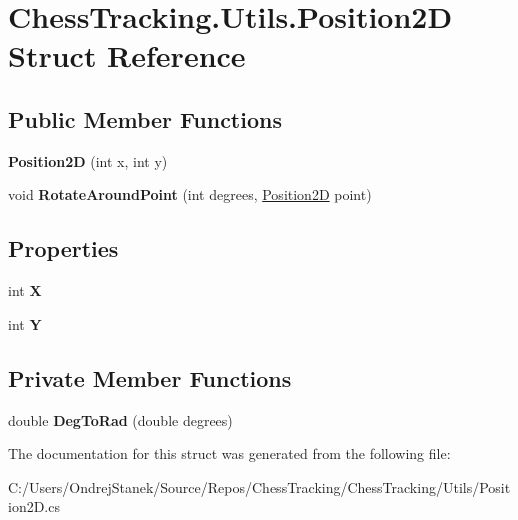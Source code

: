 \hypertarget{struct_chess_tracking_1_1_utils_1_1_position2_d}{}\section{Chess\+Tracking.\+Utils.\+Position2D Struct Reference}
\label{struct_chess_tracking_1_1_utils_1_1_position2_d}
\subsection*{Public Member Functions}
\begin{DoxyCompactItemize}
\item 
\mbox{\label{struct_chess_tracking_1_1_utils_1_1_position2_d_a6f242336351d37b9d1ec9c72255d3fcf}} 
{\bfseries Position2D} (int x, int y)
\item 
\mbox{\label{struct_chess_tracking_1_1_utils_1_1_position2_d_a8f80a66498f5bdff701000eb4c00522a}} 
void {\bfseries Rotate\+Around\+Point} (int degrees, \mbox{\hyperlink{struct_chess_tracking_1_1_utils_1_1_position2_d}{Position2D}} point)
\end{DoxyCompactItemize}
\subsection*{Properties}
\begin{DoxyCompactItemize}
\item 
\mbox{\label{struct_chess_tracking_1_1_utils_1_1_position2_d_a319301f6fe37284c7d952b54d46e445c}} 
int {\bfseries X}
\item 
\mbox{\label{struct_chess_tracking_1_1_utils_1_1_position2_d_a8a056c5c9668ba67dfa87e31ba1cd2cf}} 
int {\bfseries Y}
\end{DoxyCompactItemize}
\subsection*{Private Member Functions}
\begin{DoxyCompactItemize}
\item 
\mbox{\label{struct_chess_tracking_1_1_utils_1_1_position2_d_a5b452aed257477be13e1980bddea9d25}} 
double {\bfseries Deg\+To\+Rad} (double degrees)
\end{DoxyCompactItemize}


The documentation for this struct was generated from the following file\+:\begin{DoxyCompactItemize}
\item 
C\+:/\+Users/\+Ondrej\+Stanek/\+Source/\+Repos/\+Chess\+Tracking/\+Chess\+Tracking/\+Utils/Position2\+D.\+cs\end{DoxyCompactItemize}

